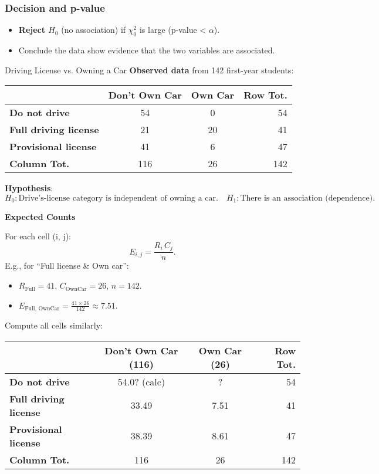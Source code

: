 \documentclass[10pt]{extarticle}
\begin{document}
\subsubsection{Decision and p-value}

\begin{itemize}
    \item \textbf{Reject $H_0$} (no association) if $\chi^2_0$ is large (p-value < $\alpha$).
    \item Conclude the data show evidence that the two variables are associated.
\end{itemize}
\begin{examplebox}{Driving License vs. Owning a Car}{}
\textbf{Observed data} from 142 first-year students:

\begin{center}
\begin{tabular}{lccr}
\toprule
 & Don't Own Car & Own Car & Row Tot. \\
\midrule
\textbf{Do not drive} & 54 & 0 & 54 \\
\textbf{Full driving license} & 21 & 20 & 41 \\
\textbf{Provisional license} & 41 & 6 & 47 \\
\midrule
\textbf{Column Tot.} & 116 & 26 & 142 \\
\bottomrule
\end{tabular}
\end{center}

\textbf{Hypothesis}:
\[
H_0: 
\text{Drive's-license category is independent of owning a car.}
\quad
H_1: 
\text{There is an association (dependence).}
\]

\textbf{Expected Counts}

For each cell (i, j):
\[
E_{i,j} 
= \frac{R_i \, C_j}{n}.
\]
E.g., for “Full license \& Own car”:
\begin{itemize}
    \item $R_{\text{Full}} = 41$, $C_{\text{OwnCar}} = 26$, $n=142$.
    \item $E_{\text{Full, OwnCar}} = \frac{41\times 26}{142}\approx 7.51.$
\end{itemize}

Compute all cells similarly:

\begin{center}
\begin{tabular}{lccr}
\toprule
 & Don't Own Car (116) & Own Car (26) & Row Tot. \\
\midrule
\textbf{Do not drive} & 54.0? (calc) & ? & 54 \\
\textbf{Full driving license} & 33.49 & 7.51 & 41 \\
\textbf{Provisional license} & 38.39 & 8.61 & 47 \\
\midrule
\textbf{Column Tot.} & 116 & 26 & 142 \\
\bottomrule
\end{tabular}
\end{center}


\end{examplebox}
\end{document}
